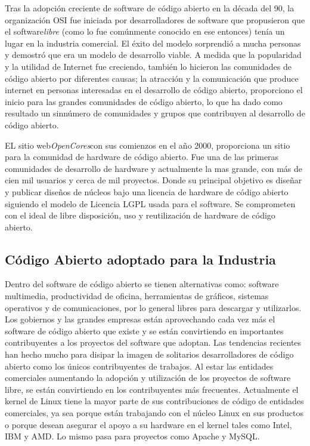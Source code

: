	Tras la adopción creciente de software de código abierto en la década del 90, la organización OSI fue iniciada por desarrolladores de software que propusieron que el 					software\textit{libre} (como lo fue comúnmente conocido en ese entonces) tenía un lugar en la industria comercial. El éxito del modelo sorprendió a mucha personas y demostró 		que era un modelo de desarrollo viable. A medida que la popularidad y la utilidad de Internet fue creciendo, también lo hicieron las comunidades de código abierto por 					diferentes causas; la atracción y la comunicación que produce internet en personas interesadas en el desarrollo de código abierto, proporciono el inicio para las grandes
	comunidades de código abierto, lo que ha dado como resultado un sinnúmero de comunidades y grupos que contribuyen al desarrollo de código abierto.


	EL sitio web\textit{OpenCores}con sus comienzos en el año 2000, proporciona un sitio para la comunidad de hardware de código abierto.
 	Fue una de las primeras comunidades de desarrollo de hardware y actualmente la mas grande, con más de cien mil usuarios y cerca de mil proyectos. Donde su
	principal objetivo es diseñar y publicar diseños de núcleos bajo una licencia de hardware de código abierto siguiendo el modelo de Licencia LGPL usada para el software.
	Se comprometen con el ideal de libre disposición, uso y reutilización de hardware de código abierto.\cite{Etiqueta10}

	\subsection{Código Abierto adoptado para la Industria}

	Dentro del software de código abierto se tienen alternativas como: software multimedia, productividad de oficina, herramientas de
	gráficos, sistemas operativos y de comunicaciones, por lo general libres para descargar y utilizarlos. Los gobiernos y las grandes empresas están aprovechando cada 			vez más el software de código abierto que existe y se están convirtiendo en importantes contribuyentes a los proyectos del software que adoptan. Las tendencias recientes han hecho mucho para disipar la imagen de solitarios desarrolladores de código abierto como los únicos contribuyentes de trabajos. Al estar las entidades comerciales aumentando la adopción y utilización de los proyectos de software libre,  se están convirtiendo en los contribuyentes más frecuentes. Actualmente el kernel de Linux tiene la mayor parte de sus contribuciones de código de entidades comerciales, ya sea porque están trabajando con el núcleo Linux en sus productos o porque desean asegurar el apoyo a su hardware en el kernel tales como Intel,  IBM y AMD. Lo mismo pasa para proyectos como Apache y MySQL.

